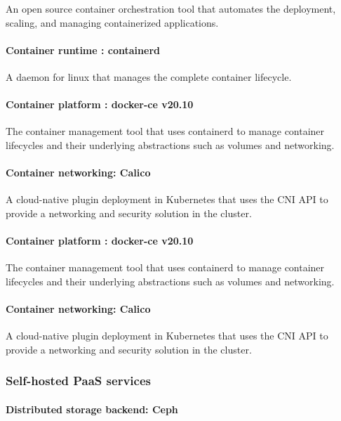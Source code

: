 An open source container orchestration tool that automates the deployment, scaling, and managing containerized applications. 

\paragraph{Container runtime : containerd }

A daemon for linux that manages the complete container lifecycle. 

\paragraph{Container platform : docker-ce v20.10 }

The container management tool that uses containerd to manage container lifecycles and their underlying abstractions such as volumes and networking.  

\paragraph{Container networking: Calico }

A cloud-native plugin deployment in Kubernetes that uses the CNI API to provide a networking and security solution in the cluster. 

\paragraph{Container platform : docker-ce v20.10 }

The container management tool that uses containerd to manage container lifecycles and their underlying abstractions such as volumes and networking. 

\paragraph{Container networking: Calico }

A cloud-native plugin deployment in Kubernetes that uses the CNI API to provide a networking and security solution in the cluster. 


\subsubsection{Self-hosted PaaS services }

\paragraph{Distributed storage backend: Ceph\cite{Ceph} }

